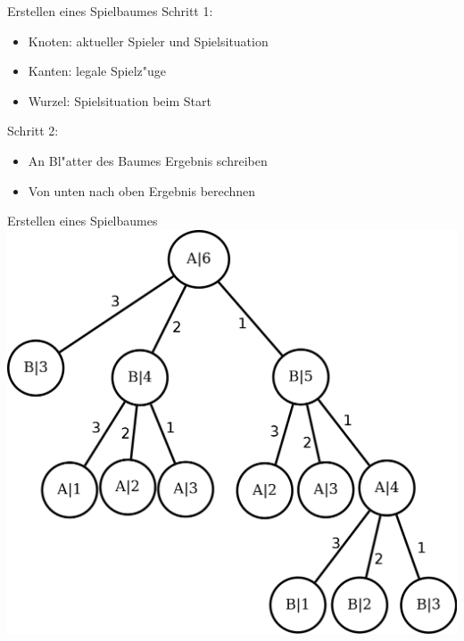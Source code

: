 \documentclass[18pt]{beamer}
\begin{document}
\begin{frame}{Erstellen eines Spielbaumes}
Schritt 1:
\begin{itemize}
\item Knoten: aktueller Spieler und Spielsituation
\item Kanten: legale Spielz"uge
\item Wurzel: Spielsituation beim Start
\end{itemize}
\pause
Schritt 2:
\begin{itemize}
\item An Bl"atter des Baumes Ergebnis schreiben
\item Von unten nach oben Ergebnis berechnen
\end{itemize}
\end{frame}

\begin{frame}{Erstellen eines Spielbaumes}
\includegraphics[scale=0.55]{baum0.png}
\end{frame}
\end{document}
